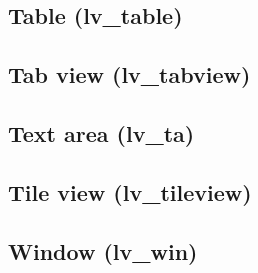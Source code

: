 \documentclass[letterpaper,10pt,english]{sphinxmanual}
\begin{document}
\begin{sphinxVerbatim}[commandchars=\\\{\}]
    
    
\end{sphinxVerbatim}


\subsection{Table (lv\_table)}
\label{\detokenize{object-types/table:table-lv-table}}\label{\detokenize{object-types/table::doc}}

\subsection{Tab view (lv\_tabview)}
\label{\detokenize{object-types/tabview:tab-view-lv-tabview}}\label{\detokenize{object-types/tabview::doc}}

\subsection{Text area (lv\_ta)}
\label{\detokenize{object-types/ta:text-area-lv-ta}}\label{\detokenize{object-types/ta::doc}}

\subsection{Tile view (lv\_tileview)}
\label{\detokenize{object-types/tileview:tile-view-lv-tileview}}\label{\detokenize{object-types/tileview::doc}}

\subsection{Window (lv\_win)}
\label{\detokenize{object-types/win:window-lv-win}}\label{\detokenize{object-types/win::doc}}


\renewcommand{\indexname}{Index}
\printindex
\end{document}
